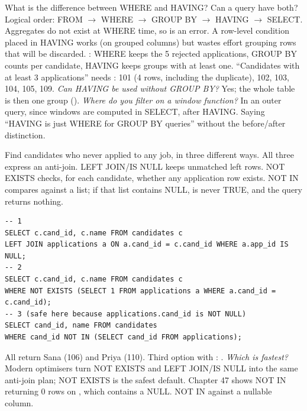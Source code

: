 \begin{qa}{\classic What is the difference between WHERE and HAVING? Can a query have both?}
\why Logical order: FROM $\to$ WHERE $\to$ GROUP BY $\to$ HAVING $\to$ SELECT. Aggregates do not exist at WHERE time, so  is an
error. A row-level condition placed in HAVING works (on grouped columns) but wastes effort grouping rows that will be discarded.
\worked {}: WHERE keeps the 5 rejected applications, GROUP BY counts per candidate, HAVING keeps groups with at least one.
``Candidates with at least 3 applications'' needs : 101 (4 rows, including the duplicate), 102, 103, 104, 105, 109.
\pushes \emph{Can HAVING be used without GROUP BY?} Yes; the whole table is then one group ().
\emph{Where do you filter on a window function?} In an outer query, since windows are computed in SELECT, after HAVING.
\pitfall Saying ``HAVING is just WHERE for GROUP BY queries'' without the before/after distinction.
\end{qa}

\begin{qa}{\classic Find candidates who never applied to any job, in three different ways.}
\why All three express an anti-join. LEFT JOIN/IS NULL keeps unmatched left rows. NOT EXISTS checks, for each candidate, whether any application row
exists. NOT IN compares against a list; if that list contains NULL,  is never TRUE, and the query returns nothing.
\worked
\begin{lstlisting}[style=sql]
-- 1
SELECT c.cand_id, c.name FROM candidates c
LEFT JOIN applications a ON a.cand_id = c.cand_id WHERE a.app_id IS NULL;
-- 2
SELECT c.cand_id, c.name FROM candidates c
WHERE NOT EXISTS (SELECT 1 FROM applications a WHERE a.cand_id = c.cand_id);
-- 3 (safe here because applications.cand_id is NOT NULL)
SELECT cand_id, name FROM candidates
WHERE cand_id NOT IN (SELECT cand_id FROM applications);
\end{lstlisting}
All return Sana (106) and Priya (110). Third option with : .
\pushes \emph{Which is fastest?} Modern optimisers turn NOT EXISTS and LEFT JOIN/IS NULL into the same anti-join plan; NOT EXISTS is the safest default.
Chapter 47 shows NOT IN returning 0 rows on , which contains a NULL.
\pitfall NOT IN against a nullable column.
\end{qa}

